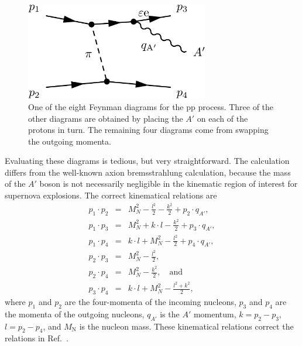 \documentclass[nofootinbib,prd,superscriptaddress,twocolumn]{revtex4}
\newcommand{\bea}{\begin{eqnarray}}
\newcommand{\eea}{\end{eqnarray}}
\newcommand{\qa}{q_{A'}}
\begin{document}
\begin{figure}
\includegraphics[width=8cm]{ppdiagram.pdf}
\caption{One of the eight Feynman diagrams for the pp process. Three of the other diagrams are obtained by 
placing the $A'$ on each of the protons in turn. The remaining four diagrams come from swapping the outgoing 
momenta.}
\label{fig:ppdiagram}
\end{figure}
	
Evaluating these diagrams is tedious, but very straightforward. The calculation differs 
from the well-known axion bremsstrahlung calculation, because the mass of the $A'$ boson is not 
necessarily negligible in the kinematic region of interest for supernova explosions.
The correct kinematical relations are 
%
\bea 
p_1 \cdot p_2 &=& M_N^2 - \frac{l^2}{2} - \frac{k^2}{2} + p_2 \cdot \qa,\\
p_1 \cdot p_3 &=& M_N^2 + k \cdot l - \frac{k^2}{2} + p_3 \cdot \qa,\\  
p_1 \cdot p_4 &=& k \cdot l + M_N^2 - \frac{l^2}{2} + p_4 \cdot \qa, \\
p_2 \cdot p_3 &=& M_N^2 - \frac{l^2}{2}, \\ 
p_2 \cdot p_4 &=& M_N^2 - \frac{k^2}{2},\quad \mathrm{and}\\
p_3 \cdot p_4 &=& k \cdot l + M_N^2 - \frac{l^2 + k^2}{2},
\eea
%
where $p_1$ and $p_2$ are the four-momenta of the incoming nucleons, $p_3$ and $p_4$ are the momenta 
of the outgoing nucleons, $\qa$ is the $A'$ momentum, $k=p_2 - p_3$, $l=p_2 - p_4$, and $M_{\mathrm{N}}$ 
is the nucleon mass. These kinematical relations correct the relations in Ref.~\cite{dent_etal12}.
\end{document}

